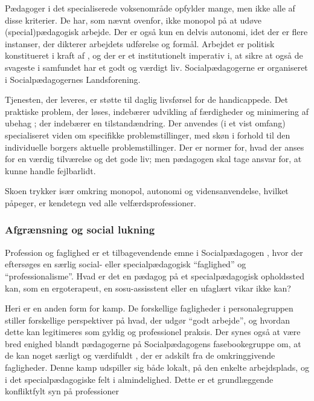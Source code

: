 Pædagoger i det specialiserede voksenområde opfylder mange, men ikke alle af disse kriterier.
De har, som nævnt ovenfor, ikke monopol på at udøve (special)pædagogisk arbejde.
Der er også kun en delvis autonomi, idet der er flere instanser, der dikterer arbejdets udførelse og formål. 
Arbejdet er politisk konstitueret i kraft af \autocite{social-ogindenrigsministerietBekendtgorelseAfLov2019}, og der er et institutionelt imperativ i, at sikre at også de svageste i samfundet har et godt og værdigt liv.
Socialpædagogerne er organiseret i Socialpædagogernes Landsforening.

Tjenesten, der leveres, er støtte til daglig livsførsel for de handicappede.
Det praktiske problem, der løses, indebærer udvikling af færdigheder og minimering af ubehag ; der indebærer en tilstandændring.
Der anvendes (i et vist omfang) specialiseret viden om specifikke problemstillinger, med skøn i forhold til den individuelle borgers aktuelle problemstillinger.
Der er normer for, hvad der anses for en værdig tilværelse og det gode liv; men pædagogen skal tage ansvar for, at kunne handle fejlbarlidt.

Skoen trykker især omkring monopol, autonomi og vidensanvendelse, hvilket \citeauthor{frederiksenVelfaerdsprofessionerMellemOmsorg2017} påpeger, er kendetegn ved alle velfærdsprofessioner.

\subsubsection{Afgrænsning og social lukning}

Profession og faglighed er et tilbagevendende emne i Socialpædagogen \autocite[fx]{petersenHvadSigerEksperten2019}, hvor der eftersøges en særlig social- eller specialpædagogisk “faglighed” og “professionalisme”.
Hvad er det en pædagog på et specialpædagogisk opholdssted kan, som en ergoterapeut, en sosu-assisstent eller en ufaglært vikar ikke kan?

Heri er en anden form for kamp.
De forskellige fagligheder i personalegruppen stiller forskellige perspektiver på hvad, der udgør “godt arbejde”, og hvordan dette kan legitimeres som gyldig og professionel praksis.
Der synes også at være bred enighed blandt pædagogerne på Socialpædagogens fasebookegruppe om, at de kan noget særligt og værdifuldt \autocite{petersenSlagsMenneskeligAltmuligmand2019}, der er adskilt fra de omkringgivende fagligheder.
Denne kamp udspiller sig både lokalt, på den enkelte arbejdsplads, og i det specialpædagogiske felt i almindelighed.
Dette er et grundlæggende konfliktfylt syn på professioner 

